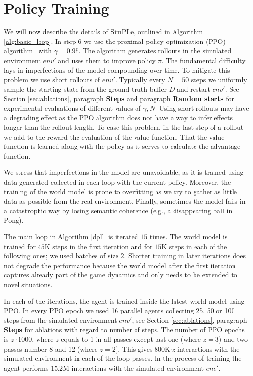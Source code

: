 \section{Policy Training} \label{sec:policy_training}
We will now describe the details of SimPLe, outlined in Algorithm \ref{alg:basic_loop}.  In step 6 we use the proximal policy optimization (PPO) algorithm~\cite{ppo} with $\gamma=0.95$. The algorithm generates rollouts in the simulated environment $env'$ and uses them to improve policy $\pi$. The fundamental difficulty lays in imperfections of the model compounding over time. To mitigate this problem we use short rollouts of $env'$. Typically every $N=50$ steps we uniformly sample the starting state from the ground-truth buffer $D$ and restart $env'$. See Section \ref{sec:ablations}, paragraph {\bf Steps} and paragraph {\bf Random starts} for experimental evaluations of different values of $\gamma, N$. Using short rollouts may have a degrading effect as the PPO algorithm does not have a way to infer effects longer than the rollout length. To ease this problem, in the last step of a rollout we add to the reward the evaluation of the value function. That the value function is learned along with the policy as it serves to calculate the advantage function.

We stress that imperfections in the model are unavoidable, as it is trained using data generated collected in each loop with the current policy. Moreover, the training of the world model is prone to overfitting as we try to gather as little data as possible from the real environment. Finally, sometimes the model fails in a catastrophic way by losing semantic coherence (e.g., a disappearing ball in Pong).

The main loop in Algorithm \ref{dpll} is iterated $15$ times. The world model is trained for $45$K steps in the first iteration and for $15$K steps in each of the following ones; we used batches of size $2$. Shorter training in later iterations does not degrade the performance because the world model after the first iteration captures already part of the game dynamics and only needs to be extended to novel situations.

In each of the iterations, the agent is trained inside the latest world model using PPO. In every PPO epoch we used 16 parallel agents collecting 25, 50 or 100 steps from the simulated environment $env'$, see Section \ref{sec:ablations}, paragraph {\bf Steps} for ablations with regard to number of steps. The number of PPO epochs is $z\cdot 1000$, where $z$ equals to 1 in all passes except last one (where $z = 3$) and two passes number 8 and 12 (where $z = 2$). This gives $800$K$\cdot z$ interactions with the simulated environment in each of the loop passes. In the process of training the agent performs  $15.2$M interactions with the simulated environment $env'$.
